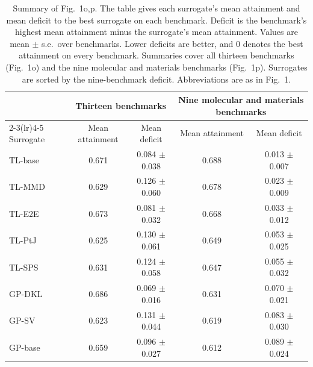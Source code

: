 \begin{table}[p]
\centering
\scriptsize
\caption{Summary of Fig.~1o,p. The table gives each surrogate's mean attainment and mean deficit to the best surrogate on each benchmark. Deficit is the benchmark's highest mean attainment minus the surrogate's mean attainment. Values are mean $\pm$ s.e.\ over benchmarks. Lower deficits are better, and 0 denotes the best attainment on every benchmark. Summaries cover all thirteen benchmarks (Fig.~1o) and the nine molecular and materials benchmarks (Fig.~1p). Surrogates are sorted by the nine-benchmark deficit. Abbreviations are as in Fig.~1.}
\label{supptab:fig1_summary}
\begin{tabular}{@{}l cc cc@{}}
\toprule
& \multicolumn{2}{c}{Thirteen benchmarks} & \multicolumn{2}{c}{Nine molecular and materials benchmarks} \\
\cmidrule(lr){2-3}\cmidrule(lr){4-5}
Surrogate & Mean attainment & Mean deficit & Mean attainment & Mean deficit \\
\midrule
TL-base & 0.671 & 0.084 $\pm$ 0.038 & 0.688 & 0.013 $\pm$ 0.007 \\
TL-MMD & 0.629 & 0.126 $\pm$ 0.060 & 0.678 & 0.023 $\pm$ 0.009 \\
TL-E2E & 0.673 & 0.081 $\pm$ 0.032 & 0.668 & 0.033 $\pm$ 0.012 \\
TL-PtJ & 0.625 & 0.130 $\pm$ 0.061 & 0.649 & 0.053 $\pm$ 0.025 \\
TL-SPS & 0.631 & 0.124 $\pm$ 0.058 & 0.647 & 0.055 $\pm$ 0.032 \\
GP-DKL & 0.686 & 0.069 $\pm$ 0.016 & 0.631 & 0.070 $\pm$ 0.021 \\
GP-SV & 0.623 & 0.131 $\pm$ 0.044 & 0.619 & 0.083 $\pm$ 0.030 \\
GP-base & 0.659 & 0.096 $\pm$ 0.027 & 0.612 & 0.089 $\pm$ 0.024 \\
\bottomrule
\end{tabular}
\end{table}


